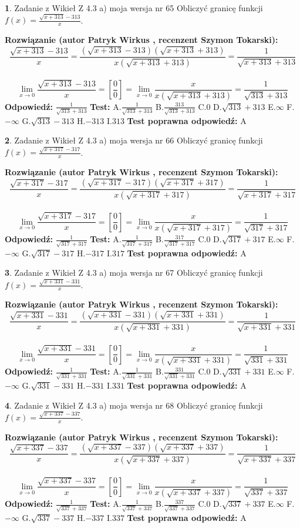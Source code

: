\documentclass[12pt, a4paper]{article}
\theoremstyle{definition} %
\newtheorem{zad}{}
\newcommand{\zadStart}[1]{\begin{zad}#1\newline}
\newcommand{\zadStop}{\end{zad}}
\newcommand{\rozwStart}[2]{\noindent \textbf{Rozwiązanie (autor #1 , recenzent #2): }\newline}
\newcommand{\rozwStop}{\newline}
\newcommand{\odpStart}{\noindent \textbf{Odpowiedź:}\newline}
\newcommand{\odpStop}{\newline}
\newcommand{\testStart}{\noindent \textbf{Test:}\newline}
\newcommand{\testStop}{\newline}
\newcommand{\kluczStart}{\noindent \textbf{Test poprawna odpowiedź:}\newline}
\newcommand{\kluczStop}{\newline}
\begin{document}
\zadStart{Zadanie z Wikieł Z 4.3 a) moja wersja nr 65}
Obliczyć granicę funkcji $f(x)=\frac{\sqrt{x+313}-313}{x}$.
\zadStop
\rozwStart{Patryk Wirkus}{Szymon Tokarski}
$$\frac{\sqrt{x+313}-313}{x}=\frac{(\sqrt{x+313}-313)(\sqrt{x+313}+313)}{x(\sqrt{x+313}+313)}=\frac{1}{\sqrt{x+313}+313}$$
\\
$$\lim\limits_{x\to0}\frac{\sqrt{x+313}-313}{x}=[\frac{0}{0}]=
\lim\limits_{x\to0}\frac{x}{x(\sqrt{x+313}+313)} = \frac{1}{\sqrt{313}+313}$$
\rozwStop
\odpStart
$\frac{1}{\sqrt{313}+313}$
\odpStop
\testStart
A.$\frac{1}{\sqrt{313}+313}$
B.$\frac{313}{\sqrt{313}+313}$
C.$0$
D.$\sqrt{313}+313$
E.$\infty$
F.$-\infty$
G.$\sqrt{313}-313$
H.$-313$
I.$313$
\testStop
\kluczStart
A
\kluczStop



\zadStart{Zadanie z Wikieł Z 4.3 a) moja wersja nr 66}
Obliczyć granicę funkcji $f(x)=\frac{\sqrt{x+317}-317}{x}$.
\zadStop
\rozwStart{Patryk Wirkus}{Szymon Tokarski}
$$\frac{\sqrt{x+317}-317}{x}=\frac{(\sqrt{x+317}-317)(\sqrt{x+317}+317)}{x(\sqrt{x+317}+317)}=\frac{1}{\sqrt{x+317}+317}$$
\\
$$\lim\limits_{x\to0}\frac{\sqrt{x+317}-317}{x}=[\frac{0}{0}]=
\lim\limits_{x\to0}\frac{x}{x(\sqrt{x+317}+317)} = \frac{1}{\sqrt{317}+317}$$
\rozwStop
\odpStart
$\frac{1}{\sqrt{317}+317}$
\odpStop
\testStart
A.$\frac{1}{\sqrt{317}+317}$
B.$\frac{317}{\sqrt{317}+317}$
C.$0$
D.$\sqrt{317}+317$
E.$\infty$
F.$-\infty$
G.$\sqrt{317}-317$
H.$-317$
I.$317$
\testStop
\kluczStart
A
\kluczStop



\zadStart{Zadanie z Wikieł Z 4.3 a) moja wersja nr 67}
Obliczyć granicę funkcji $f(x)=\frac{\sqrt{x+331}-331}{x}$.
\zadStop
\rozwStart{Patryk Wirkus}{Szymon Tokarski}
$$\frac{\sqrt{x+331}-331}{x}=\frac{(\sqrt{x+331}-331)(\sqrt{x+331}+331)}{x(\sqrt{x+331}+331)}=\frac{1}{\sqrt{x+331}+331}$$
\\
$$\lim\limits_{x\to0}\frac{\sqrt{x+331}-331}{x}=[\frac{0}{0}]=
\lim\limits_{x\to0}\frac{x}{x(\sqrt{x+331}+331)} = \frac{1}{\sqrt{331}+331}$$
\rozwStop
\odpStart
$\frac{1}{\sqrt{331}+331}$
\odpStop
\testStart
A.$\frac{1}{\sqrt{331}+331}$
B.$\frac{331}{\sqrt{331}+331}$
C.$0$
D.$\sqrt{331}+331$
E.$\infty$
F.$-\infty$
G.$\sqrt{331}-331$
H.$-331$
I.$331$
\testStop
\kluczStart
A
\kluczStop



\zadStart{Zadanie z Wikieł Z 4.3 a) moja wersja nr 68}
Obliczyć granicę funkcji $f(x)=\frac{\sqrt{x+337}-337}{x}$.
\zadStop
\rozwStart{Patryk Wirkus}{Szymon Tokarski}
$$\frac{\sqrt{x+337}-337}{x}=\frac{(\sqrt{x+337}-337)(\sqrt{x+337}+337)}{x(\sqrt{x+337}+337)}=\frac{1}{\sqrt{x+337}+337}$$
\\
$$\lim\limits_{x\to0}\frac{\sqrt{x+337}-337}{x}=[\frac{0}{0}]=
\lim\limits_{x\to0}\frac{x}{x(\sqrt{x+337}+337)} = \frac{1}{\sqrt{337}+337}$$
\rozwStop
\odpStart
$\frac{1}{\sqrt{337}+337}$
\odpStop
\testStart
A.$\frac{1}{\sqrt{337}+337}$
B.$\frac{337}{\sqrt{337}+337}$
C.$0$
D.$\sqrt{337}+337$
E.$\infty$
F.$-\infty$
G.$\sqrt{337}-337$
H.$-337$
I.$337$
\testStop
\kluczStart
A
\kluczStop
\end{document}
